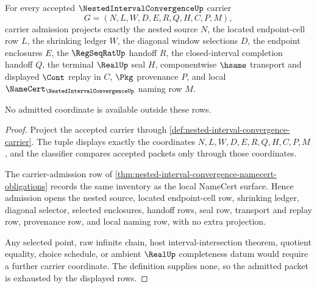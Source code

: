 \begin{theorem}
\label{thm:nested-interval-convergence-carrier-admission}
For every accepted $\NestedIntervalConvergenceUp$ carrier
$$
G=(N,L,W,D,E,R,Q,H,C,P,M),
$$
carrier admission projects exactly the nested source $N$, the located endpoint-cell row $L$, the shrinking ledger $W$, the diagonal window selections $D$, the endpoint enclosures $E$, the $\RegSeqRatUp$ handoff $R$, the closed-interval completion handoff $Q$, the terminal $\RealUp$ seal $H$, componentwise $\hsame$ transport and displayed $\Cont$ replay in $C$, $\Pkg$ provenance $P$, and local $\NameCert_{\NestedIntervalConvergenceUp}$ naming row $M$.

No admitted coordinate is available outside these rows.
\end{theorem}
\begin{proof}
Project the accepted carrier through \autoref{def:nested-interval-convergence-carrier}. The tuple displays exactly the coordinates $N,L,W,D,E,R,Q,H,C,P,M$, and the classifier compares accepted packets only through those coordinates.

The carrier-admission row of \autoref{thm:nested-interval-convergence-namecert-obligations} records the same inventory as the local NameCert surface. Hence admission opens the nested source, located endpoint-cell row, shrinking ledger, diagonal selector, selected enclosures, handoff rows, seal row, transport and replay row, provenance row, and local naming row, with no extra projection.

Any selected point, raw infinite chain, host interval-intersection theorem, quotient equality, choice schedule, or ambient $\RealUp$ completeness datum would require a further carrier coordinate. The definition supplies none, so the admitted packet is exhausted by the displayed rows.
\end{proof}

